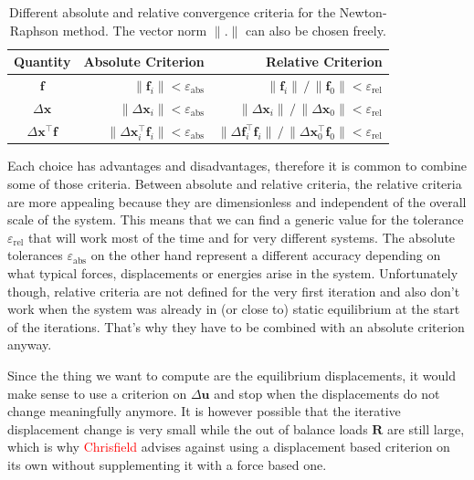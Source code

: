 \begin{table}[h]
\centering
\renewcommand{\arraystretch}{1.2}
\begin{tabular}{ | c | r | r | }
\hline
Quantity & Absolute Criterion & Relative Criterion \\
\hline
$\boldsymbol{f}$ & $\lVert \boldsymbol{f}_{i} \rVert < \varepsilon_\mathrm{abs}$ & $\lVert \boldsymbol{f}_{i} \rVert \,/\, \lVert \boldsymbol{f}_{0} \rVert < \varepsilon_\mathrm{rel}$ \\
$\Delta\boldsymbol{x}$ & $\lVert \Delta\boldsymbol{x}_{i} \rVert < \varepsilon_\mathrm{abs}$ & $\lVert \Delta\boldsymbol{x}_{i} \rVert \,/\, \lVert \Delta\boldsymbol{x}_{0} \rVert < \varepsilon_\mathrm{rel}$ \\
$\Delta\boldsymbol{x}^\intercal\boldsymbol{f}$ & $\lVert \Delta\boldsymbol{x}_{i}^\intercal\boldsymbol{f}_{i} \rVert < \varepsilon_\mathrm{abs}$ & $\lVert \Delta\boldsymbol{f}_{i}^\intercal\boldsymbol{f}_{i} \rVert \,/\, \lVert \Delta\boldsymbol{x}_{0}^\intercal\boldsymbol{f}_{0} \rVert < \varepsilon_\mathrm{rel}$ \\
\hline
\end{tabular}
\caption{Different absolute and relative convergence criteria for the Newton-Raphson method. The vector norm $\rVert.\rVert$ can also be chosen freely.}
\label{tbl:convergence-criteria}
\end{table}

Each choice has advantages and disadvantages, therefore it is common to combine some of those criteria.
Between absolute and relative criteria, the relative criteria are more appealing because they are dimensionless and independent of the overall scale of the system.
This means that we can find a generic value for the tolerance $\varepsilon_\mathrm{rel}$ that will work most of the time and for very different systems.
The absolute tolerances $\varepsilon_\mathrm{abs}$ on the other hand represent a different accuracy depending on what typical forces, displacements or energies arise in the system.
Unfortunately though, relative criteria are not defined for the very first iteration and also don't work when the system was already in (or close to) static equilibrium at the start of the iterations.
That's why they have to be combined with an absolute criterion anyway.

Since the thing we want to compute are the equilibrium displacements, it would make sense to use a criterion on $\Delta\boldsymbol{u}$ and stop when the displacements do not change meaningfully anymore.
It is however possible that the iterative displacement change is very small while the out of balance loads $\boldsymbol{R}$ are still large, which is why \textcolor{red}{Chrisfield} advises against using a displacement based criterion on its own without supplementing it with a force based one.

